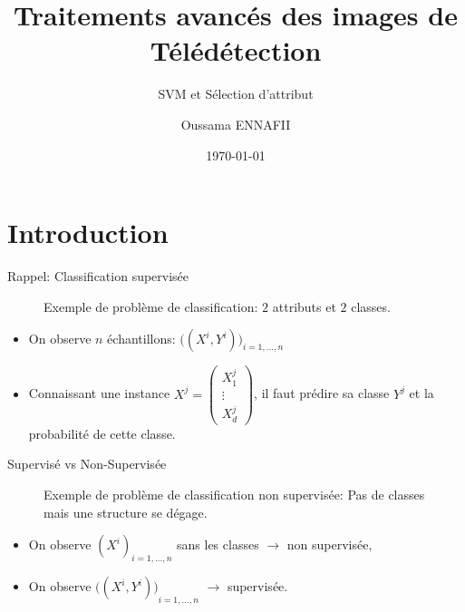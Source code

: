 \documentclass[8pt]{beamer}
\title{Traitements avancés des images de Télédétection}
\subtitle{SVM et Sélection d'attribut}
\author{Oussama ENNAFII}
\institute{ENSG}
\date{\today}
\begin{document}
	\begin{frame}[plain]
		\titlepage{}
	\end{frame}

	\section{Introduction}

	\begin{frame}{Rappel: Classification supervisée}
		\begin{figure}[H]
			\begin{center}
				
				\caption*{\tiny Exemple de problème de classification: $2$ attributs et $2$ classes.}
			\end{center}
		\end{figure}
		\begin{itemize}
			\item <1-> On observe $n$ échantillons: $\big((X^i, Y^i)\big)_{i=1,\dots,n}$
			\item <2-> Connaissant une instance $X^j = \begin{pmatrix}
			X_1^j\\
			\vdots \\
			X_d^j
			\end{pmatrix}$, il faut prédire sa classe $Y^j$ et la probabilité de cette classe.
		\end{itemize}
	\end{frame}

	\begin{frame}{Supervisé vs Non-Supervisée}
		\begin{figure}[H]
			\begin{center}
				
				\caption*{\tiny Exemple de problème de classification non supervisée: Pas de classes mais une structure se dégage.}
			\end{center}
		\end{figure}
		\begin{itemize}
			\item <1-> On observe ${(X^i)}_{i=1,\dots,n}$ sans les classes $\longrightarrow$ non supervisée,
			\item <2-> On observe ${\big((X^i, Y^i)\big)}_{i=1,\dots,n}$ $\longrightarrow$ supervisée.
		\end{itemize}
	\end{frame}
\end{document}
